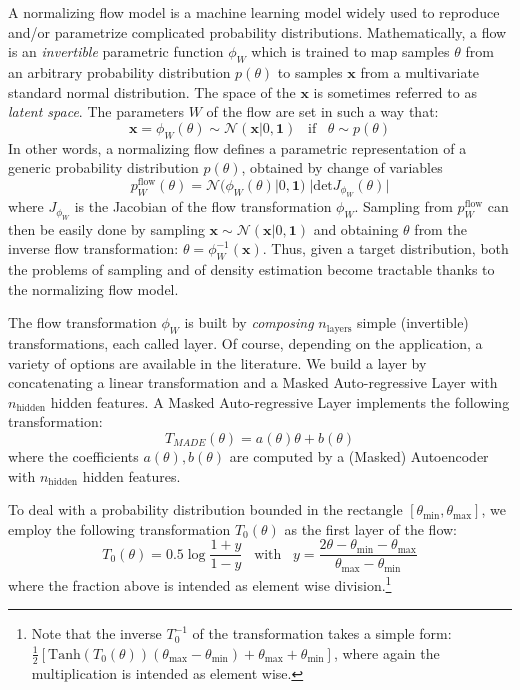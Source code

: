 \documentclass[twocolumn,showpacs,preprintnumbers,nofootinbib,prd,
superscriptaddress,10pt]{revtex4-2}
\begin{document}
A normalizing flow model \cite{norm_flow, nflows_paper, Kobyzev_2021, Papamakarios_thesis} is a machine learning model widely used to reproduce and/or parametrize complicated probability distributions.
Mathematically, a flow is an {\it invertible} parametric function $\phi_W$ which is trained to map samples $\theta$ from an arbitrary probability distribution $p(\theta)$ to samples $\mathbf{x}$ from a multivariate standard normal distribution. The space of the $\mathbf{x}$ is sometimes referred to as {\it latent space}.
The parameters $W$ of the flow are set in such a way that:
\begin{equation}
	\mathbf{x} = \phi_W(\theta) \sim \mathcal{N}(\mathbf{x}|0,\mathbf{1}) \;\;\; \text{if} \;\;\;  \theta \sim p(\theta)
\end{equation}
%
In other words, a normalizing flow defines a parametric representation of a generic probability distribution $p(\theta)$, obtained by change of variables
\begin{equation}\label{eq:p_flow}
	p^\text{flow}_W(\theta) = \mathcal{N}(\phi_W(\theta)|0,\mathbf{1}) \; |\text{det} J_{\phi_W}(\theta)|
\end{equation}
where $J_{\phi_W}$ is the Jacobian of the flow transformation $\phi_W$.
Sampling from $p^\text{flow}_W$ can then be easily done by sampling $\mathbf{x} \sim \mathcal{N}(\mathbf{x}|0,\mathbf{1})$ and obtaining $\theta$ from the inverse flow transformation: $\theta = \phi_W^{-1}(\mathbf{x})$.
Thus, given a target distribution, both the problems of sampling and of density estimation become tractable thanks to the normalizing flow model.

The flow transformation $\phi_W$ is built by {\it composing} $n_\text{layers}$ simple (invertible) transformations, each called layer. Of course, depending on the application, a variety of options are available in the literature.
We build a layer by concatenating a linear transformation and a Masked Auto-regressive Layer \cite{MADE, MAF, MAF_bis} with $n_\text{hidden}$ hidden features.
A Masked Auto-regressive Layer implements the following transformation:
\begin{equation}
	T_{MADE}(\theta) = a(\theta)\theta+b(\theta)
\end{equation}
where the coefficients $a(\theta), b(\theta)$ are computed by a (Masked) Autoencoder with $n_\text{hidden}$ hidden features.

To deal with a probability distribution bounded in the rectangle $[\theta_\text{min}, \theta_\text{max}]$, we employ the following transformation $T_0(\theta)$ as the first layer of the flow:
\begin{equation}\label{eq:first_transform}
	T_0(\theta) = 0.5 \log \frac{1 + y}{1 - y} \;\;\; \text{with} \;\;\; y = \frac{2\theta - \theta_\text{min} - \theta_\text{max}}{\theta_\text{max}- \theta_\text{min}}
\end{equation}
where the fraction above is intended as element wise division.\footnote{
Note that the inverse $T_0^{-1}$ of the transformation takes a simple form: $\frac{1}{2} [\text{Tanh}(T_0(\theta))(\theta_\text{max} - \theta_\text{min})+\theta_\text{max}+ \theta_\text{min}]$, where again the multiplication is intended as element wise.
}
\end{document}
